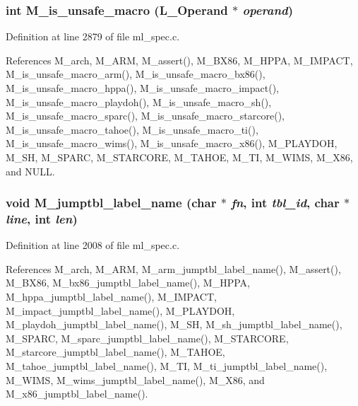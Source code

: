 \subsubsection{\setlength{\rightskip}{0pt plus 5cm}int M\_\-is\_\-unsafe\_\-macro (L\_\-Operand $\ast$ {\em operand})}\label{m__spec_8h_f1075ea52c85b7c994e8be541eb530ab}




Definition at line 2879 of file ml\_\-spec.c.

References M\_\-arch, M\_\-ARM, M\_\-assert(), M\_\-BX86, M\_\-HPPA, M\_\-IMPACT, M\_\-is\_\-unsafe\_\-macro\_\-arm(), M\_\-is\_\-unsafe\_\-macro\_\-bx86(), M\_\-is\_\-unsafe\_\-macro\_\-hppa(), M\_\-is\_\-unsafe\_\-macro\_\-impact(), M\_\-is\_\-unsafe\_\-macro\_\-playdoh(), M\_\-is\_\-unsafe\_\-macro\_\-sh(), M\_\-is\_\-unsafe\_\-macro\_\-sparc(), M\_\-is\_\-unsafe\_\-macro\_\-starcore(), M\_\-is\_\-unsafe\_\-macro\_\-tahoe(), M\_\-is\_\-unsafe\_\-macro\_\-ti(), M\_\-is\_\-unsafe\_\-macro\_\-wims(), M\_\-is\_\-unsafe\_\-macro\_\-x86(), M\_\-PLAYDOH, M\_\-SH, M\_\-SPARC, M\_\-STARCORE, M\_\-TAHOE, M\_\-TI, M\_\-WIMS, M\_\-X86, and NULL.
\subsubsection{\setlength{\rightskip}{0pt plus 5cm}void M\_\-jumptbl\_\-label\_\-name (char $\ast$ {\em fn}, int {\em tbl\_\-id}, char $\ast$ {\em line}, int {\em len})}\label{m__spec_8h_73b43d4ab02148047a10ea26fa00b7ac}




Definition at line 2008 of file ml\_\-spec.c.

References M\_\-arch, M\_\-ARM, M\_\-arm\_\-jumptbl\_\-label\_\-name(), M\_\-assert(), M\_\-BX86, M\_\-bx86\_\-jumptbl\_\-label\_\-name(), M\_\-HPPA, M\_\-hppa\_\-jumptbl\_\-label\_\-name(), M\_\-IMPACT, M\_\-impact\_\-jumptbl\_\-label\_\-name(), M\_\-PLAYDOH, M\_\-playdoh\_\-jumptbl\_\-label\_\-name(), M\_\-SH, M\_\-sh\_\-jumptbl\_\-label\_\-name(), M\_\-SPARC, M\_\-sparc\_\-jumptbl\_\-label\_\-name(), M\_\-STARCORE, M\_\-starcore\_\-jumptbl\_\-label\_\-name(), M\_\-TAHOE, M\_\-tahoe\_\-jumptbl\_\-label\_\-name(), M\_\-TI, M\_\-ti\_\-jumptbl\_\-label\_\-name(), M\_\-WIMS, M\_\-wims\_\-jumptbl\_\-label\_\-name(), M\_\-X86, and M\_\-x86\_\-jumptbl\_\-label\_\-name().
